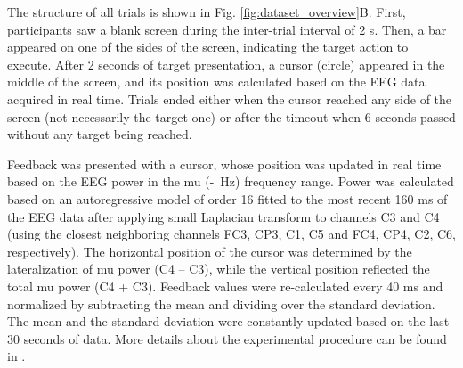 \medskip

The structure of all trials is shown in Fig. \ref{fig:dataset_overview}B. First, participants saw a blank screen during the inter-trial interval of 2 s. Then, a bar appeared on one of the sides of the screen, indicating the target action to execute. After 2 seconds of target presentation, a cursor (circle) appeared in the middle of the screen, and its position was calculated based on the EEG data acquired in real time. Trials ended either when the cursor reached any side of the screen (not necessarily the target one) or after the timeout when 6 seconds passed without any target being reached.

\medskip

Feedback was presented with a cursor, whose position was updated in real time based on the EEG power in the mu (\muLow-\muHigh~Hz) frequency range. Power was calculated based on an autoregressive model of order 16 fitted to the most recent 160 ms of the EEG data after applying small Laplacian transform to channels C3 and C4 (using the closest neighboring channels FC3, CP3, C1, C5 and FC4, CP4, C2, C6, respectively). The horizontal position of the cursor was determined by the lateralization of mu power (C4 -- C3), while the vertical position reflected the total mu power (C4 + C3). Feedback values were re-calculated every 40 ms and normalized by subtracting the mean and dividing over the standard deviation. The mean and the standard deviation were constantly updated based on the last 30 seconds of data. More details about the experimental procedure can be found in \citep{Stieger2021_dataset}.

